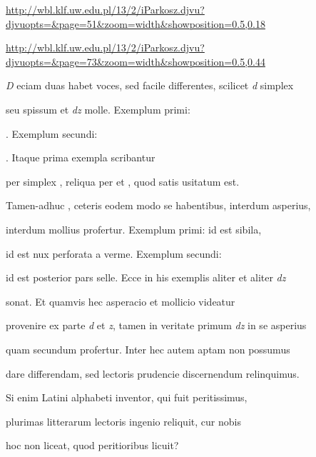 
\newParkoszpage


{
\url{http://wbl.klf.uw.edu.pl/13/2/iParkosz.djvu?djvuopts=&page=51&zoom=width&showposition=0.5,0.18}

\url{http://wbl.klf.uw.edu.pl/13/2/iParkosz.djvu?djvuopts=&page=73&zoom=width&showposition=0.5,0.44}
}



\fulllines

\indentK \textit{D} eciam duas habet voces, sed facile differentes, scilicet \textit{d} simplex

seu spissum et \textit{dz} molle. Exemplum primi:   

  . Exemplum secundi:    

   . Itaque prima exempla scribantur

per simplex , reliqua per  et , quod satis usitatum est.

\indentK Tamen-adhuc , ceteris eodem modo se habentibus, interdum asperius,

interdum mollius profertur. Exemplum primi:  id est sibila,

 id est nux perforata a verme. Exemplum secundi: 

id est posterior pars selle. Ecce in his exemplis aliter et aliter \textit{dz}

sonat. Et quamvis hec asperacio et mollicio videatur

provenire ex parte \textit{d} et \textit{z}, tamen in veritate primum \textit{dz} in se asperius

quam secundum profertur. Inter hec autem aptam non possumus

dare differendam, sed lectoris prudencie discernendum relinquimus.

Si enim Latini alphabeti inventor, qui fuit peritissimus,

plurimas  litterarum lectoris ingenio reliquit, cur nobis

hoc non liceat, quod peritioribus licuit?

